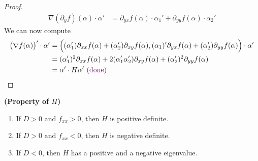 \documentclass{report}
\begin{document}
\begin{proof}
\begin{align*}
\nabla(\partial _y f)(\alpha )\cdot \alpha '&=\partial_{yx} f(\alpha )\cdot \alpha_1' + \partial_{yy}f(\alpha ) \cdot  \alpha_2' 
\end{align*}
We can now compute 
\begin{align*}
  \big(\nabla f(\alpha ) \big)' \cdot \alpha '&= \Big((\alpha_1')\partial_{x x}f(\alpha ) + (\alpha_2')\partial_{xy}f(\alpha ), (\alpha _1)' \partial_{yx}f(\alpha )+ (\alpha _2')\partial_{yy}f(\alpha )\Big) \cdot \alpha ' \\
  &= (\alpha_1')^2 \partial_{x x}f(\alpha ) + 2(\alpha _1' \alpha _2')\partial_{xy} f(\alpha )+ (\alpha_2')^2 \partial_{yy}f(\alpha )\\
  &= \alpha' \cdot H \alpha '\textcolor{violet}{\text{ (done) }}
\end{align*}
\end{proof}
\begin{lemma}
\label{5103}
\textbf{(Property of $H$)} 
\begin{enumerate}[label=(\alph*)]
  \item If $D>0$ and  $f_{xx}>0$, then $H$ is positive definite.
  \item If $D>0\text{ and }f_{xx}<0$, then $H$ is negative definite. 
  \item If $D<0$, then $H$ has a positive and a negative eigenvalue.
\end{enumerate}
\end{lemma}
\end{document}
